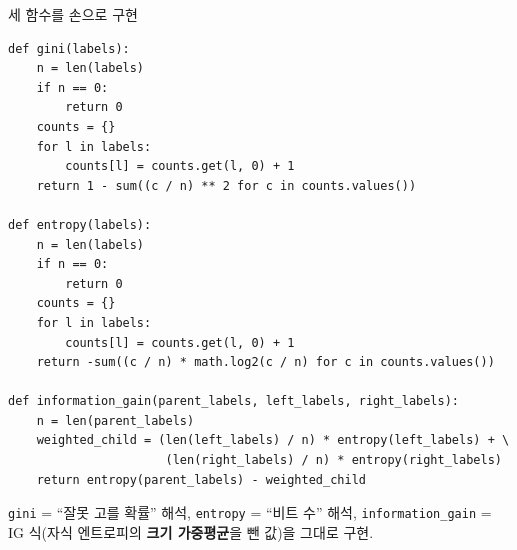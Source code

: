 \begin{frame}[fragile,shrink=20]{세 함수를 손으로 구현}
\begin{lstlisting}
def gini(labels):
    n = len(labels)
    if n == 0:
        return 0
    counts = {}
    for l in labels:
        counts[l] = counts.get(l, 0) + 1
    return 1 - sum((c / n) ** 2 for c in counts.values())

def entropy(labels):
    n = len(labels)
    if n == 0:
        return 0
    counts = {}
    for l in labels:
        counts[l] = counts.get(l, 0) + 1
    return -sum((c / n) * math.log2(c / n) for c in counts.values())

def information_gain(parent_labels, left_labels, right_labels):
    n = len(parent_labels)
    weighted_child = (len(left_labels) / n) * entropy(left_labels) + \
                      (len(right_labels) / n) * entropy(right_labels)
    return entropy(parent_labels) - weighted_child
\end{lstlisting}
  {\footnotesize \texttt{gini} = ``잘못 고를 확률'' 해석, \texttt{entropy} =
  ``비트 수'' 해석, \texttt{information\_gain} = IG 식(자식 엔트로피의
  \textbf{크기 가중평균}을 뺀 값)을 그대로 구현.}
\end{frame}
